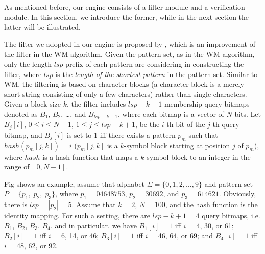 \documentclass{article}
\begin{document}
As mentioned before, our engine consists of a filter module and a
verification module. In this section, we introduce the former, while
in the next section the latter will be illustrated.


The filter we adopted in our engine is proposed by \cite{Lee2013},
which is an improvement of the filter in the WM algorithm. Given the
pattern set, as in the WM algorithm, only the length-$lsp$ prefix of
each pattern are considering in constructing the filter, where $lsp$
is the \emph{length of the shortest pattern} in the pattern
set. Similar to WM, the filtering is based on character blocks (a
character block is a merely short string consisting of only a few
characters) rather than single characters. Given a block size $k$, the
filter includes $lsp-k+1$ membership query bitmaps denoted as $B_1$,
$B_2$, \dots, and $B_{lsp-k+1}$, where each bitmap is a vector of $N$
bits. Let $B_j[i]$, $0 \leq i \leq N - 1$, $1 \leq j \leq lsp-k+1$, be
the $i$-th bit of the $j$-th query bitmap, and $B_j[i]$ is set to 1
iff there exists a pattern $p_m$ such that $hash(p_m[j,k]) = i$
($p_m[j,k]$ is a $k$-symbol block starting at position $j$ of $p_m$),
where $hash$ is a hash function that maps a $k$-symbol block to an
integer in the range of $[0, N-1]$.

Fig shows an example, assume that alphabet
$\Sigma = \{0, 1, 2, \dots, 9\}$ and pattern set
$P = \{p_1,\; p_2,\; p_3\}$, where $p_1 = 04648753$, $p_2 = 30692$,
and $p_3 = 614621$. Obviously, there is $lsp = |p_2|= 5$. Assume that
$k = 2$, $N = 100$, and the hash function is the identity mapping. For
such a setting, there are $lsp - k + 1 = 4$ query bitmaps, i.e. $B_1$,
$B_2$, $B_3$, $B_4$, and in particular, we have $B_1[i] = 1$ iff $i$ =
4, 30, or 61; $B_2[i] = 1$ iff $i$ = 6, 14, or 46; $B_3[i] = 1$ iff
$i$ = 46, 64, or 69; and $B_4[i] = 1$ iff $i$ = 48, 62, or 92.
\end{document}
